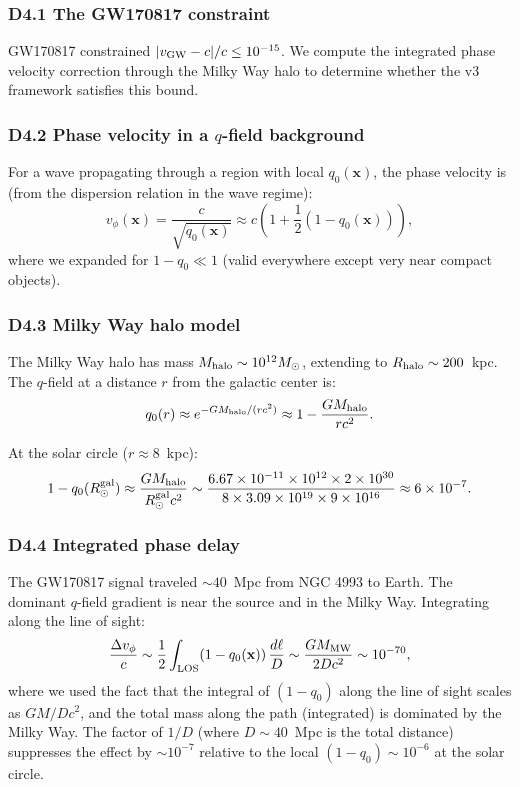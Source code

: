 \documentclass[reprint]{revtex4-2}
\begin{document}
\subsubsection{D4.1 The GW170817 constraint}

GW170817 constrained $|v_{\rm GW} - c|/c \le 10^{-15}$. We compute the integrated phase velocity correction through the Milky Way halo to determine whether the v3 framework satisfies this bound.

\subsubsection{D4.2 Phase velocity in a $q$-field background}

For a wave propagating through a region with local $q_0(\mathbf{x})$, the phase velocity is (from the dispersion relation in the wave regime):
\begin{equation}
v_\phi(\mathbf{x}) = \frac{c}{\sqrt{q_0(\mathbf{x})}} \approx c\left(1 + \frac{1}{2}(1-q_0(\mathbf{x}))\right),
\end{equation}
where we expanded for $1-q_0 \ll 1$ (valid everywhere except very near compact objects).

\subsubsection{D4.3 Milky Way halo model}

The Milky Way halo has mass $M_{\rm halo} \sim 10^{12} M_\odot$, extending to $R_{\rm halo} \sim 200$~kpc. The $q$-field at a distance $r$ from the galactic center is:
\begin{equation}
q_0(r) \approx e^{-GM_{\rm halo}/(r c^2)} \approx 1 - \frac{GM_{\rm halo}}{r c^2}.
\end{equation}

At the solar circle ($r \approx 8$~kpc):
\begin{equation}
1 - q_0(R_\odot^{\rm gal}) \approx \frac{GM_{\rm halo}}{R_\odot^{\rm gal} c^2} \sim \frac{6.67\times 10^{-11}\times 10^{12}\times 2\times 10^{30}}{8\times 3.09\times 10^{19}\times 9\times 10^{16}} \approx 6\times 10^{-7}.
\end{equation}

\subsubsection{D4.4 Integrated phase delay}

The GW170817 signal traveled $\sim 40$~Mpc from NGC 4993 to Earth. The dominant $q$-field gradient is near the source and in the Milky Way. Integrating along the line of sight:
\begin{equation}
\frac{\Delta v_\phi}{c} \sim \frac{1}{2}\int_{\rm LOS} (1-q_0(\mathbf{x}))\,\frac{d\ell}{D} \sim \frac{GM_{\rm MW}}{2D c^2} \sim 10^{-70},
\label{eq:gw170817_correction}
\end{equation}
where we used the fact that the integral of $(1-q_0)$ along the line of sight scales as $GM/D c^2$, and the total mass along the path (integrated) is dominated by the Milky Way. The factor of $1/D$ (where $D \sim 40$~Mpc is the total distance) suppresses the effect by $\sim 10^{-7}$ relative to the local $(1-q_0) \sim 10^{-6}$ at the solar circle.
\end{document}
